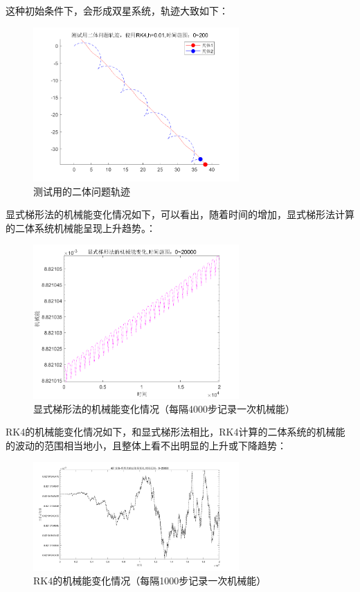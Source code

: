 \documentclass{article}
\begin{document}
\par 这种初始条件下，会形成双星系统，轨迹大致如下：
\begin{figure}[H]
	\centering  %
	\includegraphics[width=0.7\textwidth]{二体问题-能量误差//测试用二体问题轨迹，使用RK4,h=0.01,时间范围：0~200}
	\caption{测试用的二体问题轨迹}
	\label{Two-Body-orbit}
\end{figure}
\par 显式梯形法的机械能变化情况如下，可以看出，随着时间的增加，显式梯形法计算的二体系统机械能呈现上升趋势。：
\begin{figure}[H]
	\centering  %
	\includegraphics[width=0.7\textwidth]{二体问题-能量误差//显式梯形法的机械能变化,时间范围：0~20000}
	\caption{显式梯形法的机械能变化情况（每隔4000步记录一次机械能）}
	\label{Two-Body-energy-exTrap}
\end{figure}

\par RK4的机械能变化情况如下，和显式梯形法相比，RK4计算的二体系统的机械能的波动的范围相当地小，且整体上看不出明显的上升或下降趋势：
\begin{figure}[H]
	\centering  %
	\includegraphics[width=0.7\textwidth]{二体问题-能量误差//4阶龙格-库塔法的总能量变化,时间范围：0~20000}
	\caption{RK4的机械能变化情况（每隔1000步记录一次机械能）}
	\label{Two-Body-energy-RK4}
\end{figure}
 
\end{document}
